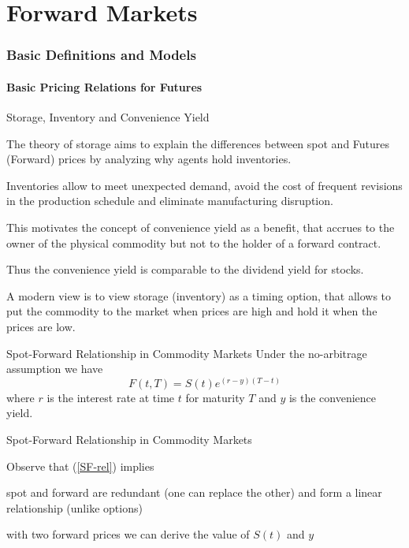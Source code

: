 \part{Forward Markets}
\section{Basic Definitions and Models}
\subsection{Basic Pricing Relations for Futures}

{Storage, Inventory and Convenience Yield}


	The theory of storage aims to explain the differences between spot
and Futures (Forward) prices by analyzing why agents hold inventories.

	Inventories
allow to meet unexpected demand, avoid the cost of frequent revisions in
the production schedule and eliminate manufacturing disruption.

	This
motivates the concept of convenience yield as a benefit, that accrues to the
owner of the physical commodity but not to the holder of a forward contract.

	Thus the convenience yield is comparable to the dividend yield for stocks.

	A modern view is to view storage (inventory) as a timing option, that
allows to put the commodity to the market when prices are high
and hold it when the prices are low.


{Spot-Forward Relationship in Commodity Markets }
Under the no-arbitrage assumption we have
\begin{equation}\label{SF-rel}
F(t,T)=S(t)e^{(r-y)(T-t)}
\end{equation}
where $r$ is the interest rate at time $t$ for maturity $T$ and $y$ is the convenience yield.

{Spot-Forward Relationship in Commodity Markets }

Observe that (\ref{SF-rel}) implies


	spot and forward are redundant (one can replace the other) and form a
linear relationship (unlike options)

	with two forward prices we can derive the value of $S(t)$ and $y$

